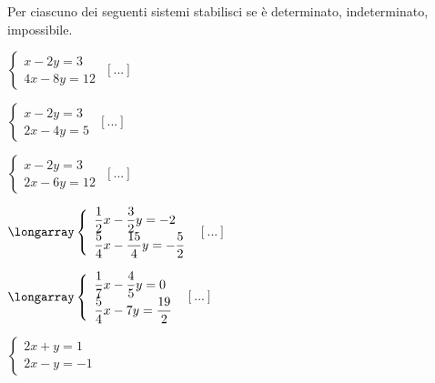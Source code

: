 


\begin{esercizio}
 \label{ese:22.31}
Per ciascuno dei seguenti sistemi stabilisci se è determinato,
indeterminato, impossibile.
\begin{multicols}{2}
\begin{enumeratea}
\item \(\left\{\begin{array}{l}x-2y=3 \\4x-8y=12\end{array}\right.\)
 \hfill \(\left[...\right]\)
\item \(\left\{\begin{array}{l}x-2y=3 \\2x-4y=5\end{array}\right.\)
 \hfill \(\left[...\right]\)
\item \(\left\{\begin{array}{l}x-2y=3 \\2x-6y=12\end{array}\right.\)
 \hfill \(\left[...\right]\)
\item \(\longarray\left\{\begin{array}{l}
\dfrac{1}{2}x-\dfrac{3}{2}y=-2\\
\dfrac{5}{4}x-\dfrac{15}{4}y=-{\dfrac{5}{2}}\end{array}\right.\)
 \hfill \(\left[...\right]\)
\item \(\longarray\left\{\begin{array}{l}
\dfrac{1}{7}x-\dfrac{4}{5}y=0\\
\dfrac{5}{4}x-7y=\dfrac{19}{2}\end{array}\right.\)
 \hfill \(\left[...\right]\)
\item \(\left\{\begin{array}{l}2x+y=1 \\2x-y=-1\end{array}\right.\)

\end{enumeratea}
\end{multicols}
\end{esercizio}
